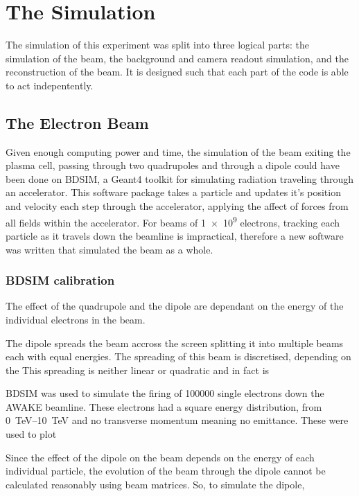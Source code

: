 
\section{The Simulation}

The simulation of this experiment was split into three logical parts: the
simulation of the beam, the background and camera readout simulation, and the
reconstruction of the beam.
It is designed such that each part of the code is able to act indepentently.

\subsection{The Electron Beam}

Given enough computing power and time, the simulation of the beam exiting the
plasma cell, passing through two quadrupoles and through a dipole could have
been done on BDSIM, a Geant4 toolkit for simulating radiation traveling through
an accelerator. This software package takes a particle and updates it's
position and velocity each step through the accelerator, applying the affect of
forces from all fields within the accelerator.  For beams of \num{1e9}
electrons, tracking each particle as it travels down the beamline is
impractical, therefore a new software was written that simulated the beam as
a whole.

\subsubsection{BDSIM calibration}


The effect of the quadrupole and the dipole are dependant on the energy of the
individual electrons in the beam.

The dipole spreads the beam accross the screen splitting it into multiple beams
each with equal energies. The spreading of this beam is discretised, depending on
the This spreading is neither linear or quadratic and in
fact is 


BDSIM was used to simulate the firing of \num{100 000} single electrons down
the AWAKE beamline. These electrons had a square energy distribution, from
\SIrange{0}{10}{\tera\electronvolt} and no transverse momentum meaning no
emittance. These were used to plot 

Since the effect of the dipole on the beam depends on the energy of each
individual particle, the evolution of the beam through the dipole cannot be
calculated reasonably using beam matrices. So, to simulate the dipole, 

